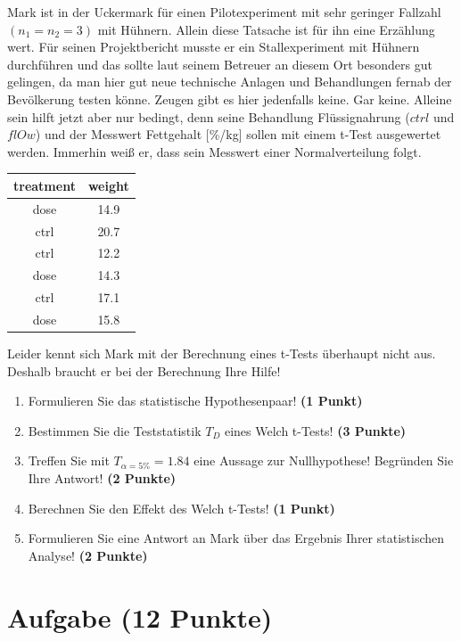 \documentclass[a4paper, 9pt]{scrartcl}\usepackage[]{graphicx}\usepackage[]{xcolor}
\begin{document}
Mark ist in der Uckermark für einen Pilotexperiment mit sehr geringer Fallzahl $(n_1 = n_2 = 3)$ mit Hühnern. Allein diese Tatsache ist für ihn eine Erzählung wert. Für seinen Projektbericht musste er ein Stallexperiment mit Hühnern durchführen und das sollte laut seinem Betreuer an diesem Ort besonders gut gelingen, da man hier gut neue technische Anlagen und Behandlungen fernab der Bevölkerung testen könne. Zeugen gibt es hier jedenfalls keine. Gar keine. Alleine sein hilft jetzt aber nur bedingt, denn seine Behandlung Flüssignahrung ($ctrl$ und $flOw$) und der Messwert Fettgehalt [\%/kg] sollen mit einem t-Test ausgewertet werden. Immerhin weiß er, dass sein Messwert einer Normalverteilung folgt. 

\begin{table}[!h]
\centering
\begin{tabular}{cc}
\toprule
treatment & weight\\
\midrule
dose & 14.9\\
ctrl & 20.7\\
ctrl & 12.2\\
dose & 14.3\\
ctrl & 17.1\\
\addlinespace
dose & 15.8\\
\bottomrule
\end{tabular}
\end{table}



Leider kennt sich Mark mit der Berechnung eines t-Tests überhaupt nicht aus. Deshalb braucht er bei der Berechnung Ihre Hilfe!

\begin{enumerate}
  \item Formulieren Sie das statistische Hypothesenpaar! \textbf{(1 Punkt)}
  \item Bestimmen Sie die Teststatistik $T_{D}$ eines Welch t-Tests! \textbf{(3 Punkte)}
  \item Treffen Sie mit $T_{\alpha = 5\%} = 1.84$ eine Aussage zur Nullhypothese! Begründen Sie Ihre Antwort! \textbf{(2 Punkte)}
  \item Berechnen Sie den Effekt des Welch t-Tests! \textbf{(1 Punkt)}
  \item Formulieren Sie eine Antwort an Mark über das Ergebnis Ihrer statistischen Analyse! \textbf{(2 Punkte)}
\end{enumerate} 
\clearpage

\section{Aufgabe \hfill (12 Punkte)}
\end{document}
